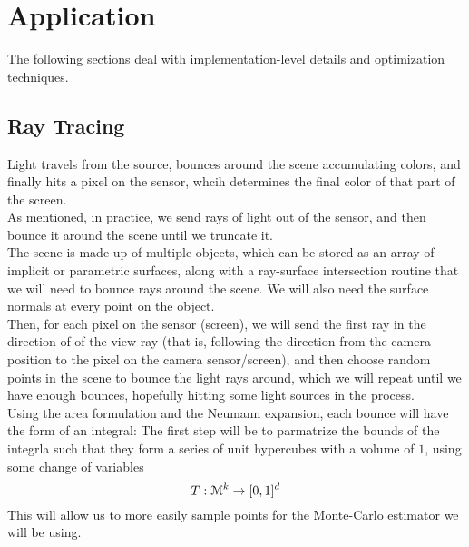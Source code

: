 \documentclass[12pt]{article}
\begin{document}
\newpage

\section*{Application}

The following sections deal with implementation-level
details and optimization techniques. \\

\newpage

\subsection*{Ray Tracing}

Light travels from the source, bounces around the
scene accumulating colors, and finally hits a pixel
on the sensor, whcih determines the final color
of that part of the screen. \\

As mentioned, in practice, we send rays of
light out of the sensor, and then bounce it around
the scene until we truncate it. \\

The scene is made up of multiple objects, which
can be stored as an array of implicit or parametric
surfaces, along with a ray-surface intersection
routine that we will need to bounce rays
around the scene. We will also need the
surface normals at every point on the object. \\

Then, for each pixel on the sensor (screen), we will
send the first ray in the direction of of the view ray
(that is, following the direction from the camera position
to the pixel on the camera sensor/screen), and then choose
random points in the scene to bounce the light rays
around, which we will repeat until we have
enough bounces, hopefully hitting some light sources in
the process. \\

Using the area formulation and the Neumann expansion, 
each bounce will have the form of an integral:
The first step will be to parmatrize the bounds of the
integrla such that they form a series of unit hypercubes
with a volume of $1$, using some change of variables
\[ T: \mathcal{M}^k \to [0, 1]^d \]
This will allow us to more easily sample points
for the Monte-Carlo estimator we will be using. \\
\end{document}

